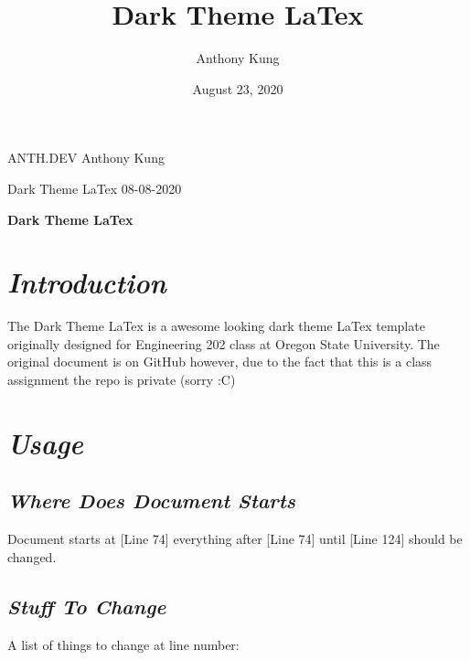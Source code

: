 \documentclass{article}
\title{Dark Theme LaTex}
\author{
  Anthony Kung
}
\date{August 23, 2020}
\begin{document}
\selectfont

ANTH.DEV
\hfill
Anthony Kung

Dark Theme LaTex
\hfill
08-08-2020

\begin{center}
  \large\textbf{Dark Theme LaTex}
  \\
\end{center}

\tableofcontents

\setlength{\parskip}{1em}

\section{\textbf{\textit{Introduction}}}

The Dark Theme LaTex is a awesome looking dark theme LaTex template originally designed for Engineering 202 class at Oregon State University. The original document is on GitHub however, due to the fact that this is a class assignment the repo is private (sorry :C)

\section{\textbf{\textit{Usage}}}

\subsection{\textbf{\textit{Where Does Document Starts}}}

Document starts at [Line 74] everything after [Line 74] until [Line 124] should be changed.

\subsection{\textbf{\textit{Stuff To Change}}}

A list of things to change at line number:
\end{document}
